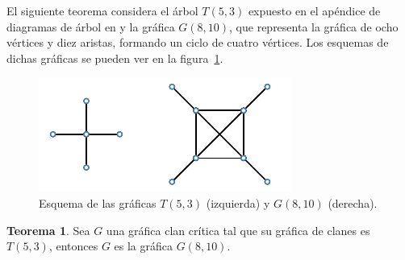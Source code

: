 \documentclass[12pt]{book}
\theoremstyle{definition}
\newtheorem{theorem}{Teorema}[chapter]
\begin{document}
El siguiente teorema considera el árbol $T(5,3)$ expuesto en el apéndice de diagramas de árbol en \cite{Harary:1969} y la gráfica $G(8,10)$, que representa la gráfica de ocho vértices y diez aristas, formando un ciclo de cuatro vértices. Los esquemas de dichas gráficas se pueden ver en la figura~\ref{F9}.

\begin{figure}[!htbp]
	\centering
	\includegraphics[scale=1.2]{Fig9.pdf}
	\caption{Esquema de las gráficas $T(5,3)$ (izquierda) y $G(8,10)$ (derecha).\label{F9}}
\end{figure}

\begin{theorem}
Sea $G$ una gráfica clan crítica tal que su gráfica de clanes es $T(5,3)$, entonces $G$ es la gráfica $G(8,10)$.
\end{theorem}






\end{document}
